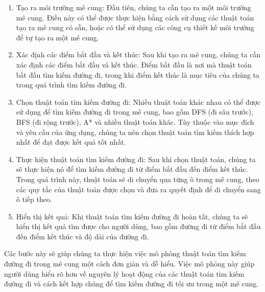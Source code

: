\begin{enumerate}
	\item Tạo ra môi trường mê cung: Đầu tiên, chúng ta cần tạo ra một môi trường mê cung. Điều này có thể được thực hiện bằng cách sử dụng các thuật toán tạo ra mê cung có sẵn, hoặc có thể sử dụng các công cụ thiết kế môi trường để tự tạo ra một mê cung.
	\item Xác định các điểm bắt đầu và kết thúc: Sau khi tạo ra mê cung, chúng ta cần xác định các điểm bắt đầu và kết thúc. Điểm bắt đầu là nơi mà thuật toán bắt đầu tìm kiếm đường đi, trong khi điểm kết thúc là mục tiêu của chúng ta trong quá trình tìm kiếm đường đi.
	\item Chọn thuật toán tìm kiếm đường đi: Nhiều thuật toán khác nhau có thể được sử dụng để tìm kiếm đường đi trong mê cung, bao gồm DFS (đi sâu trước), BFS (đi rộng trước), A* và nhiều thuật toán khác. Tùy thuộc vào mục đích và yêu cầu của ứng dụng, chúng ta nên chọn thuật toán tìm kiếm thích hợp nhất để đạt được kết quả tốt nhất.
	\item Thực hiện thuật toán tìm kiếm đường đi: Sau khi chọn thuật toán, chúng ta sẽ thực hiện nó để tìm kiếm đường đi từ điểm bắt đầu đến điểm kết thúc. Trong quá trình này, thuật toán sẽ di chuyển qua từng ô trong mê cung, theo các quy tắc của thuật toán được chọn và đưa ra quyết định để di chuyển sang ô tiếp theo.
	\item Hiển thị kết quả: Khi thuật toán tìm kiếm đường đi hoàn tất, chúng ta sẽ hiển thị kết quả tìm được cho người dùng, bao gồm đường đi từ điểm bắt đầu đến điểm kết thúc và độ dài của đường đi.
\end{enumerate}


Các bước này sẽ giúp chúng ta thực hiện việc mô phỏng thuật toán tìm kiếm đường đi trong mê cung một cách đơn giản và dễ hiểu. Việc mô phỏng này giúp người dùng hiểu rõ hơn về nguyên lý hoạt động của các thuật toán tìm kiếm đường đi và cách kết hợp chúng để tìm kiếm đường đi tối ưu trong một mê cung.







